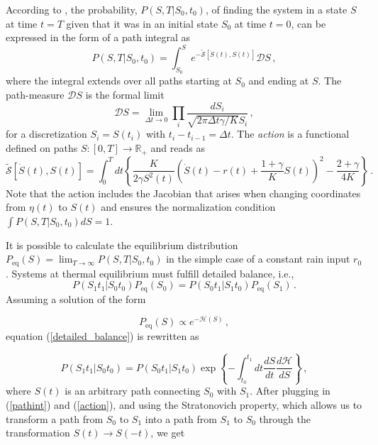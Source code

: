 \documentclass[11pt, a4paper]{article}
\begin{document}
According to \cite{lau_2007_StateDepDiff}, the probability, $P(S,T|S_0,t_0)$, of finding the system in a state $S$ at time $t = T$ given that it was in an initial state $S_0$ at time $t = 0$, can be expressed in the form of a path integral as
\begin{equation}\label{pathint}
P(S,T|S_0,t_0) = \int_{S_0}^{S} e^{-\tilde{\mathcal S}[\dot{S}(t),S(t)]} \mathcal{D}S \,,
\end{equation}
where the integral extends over all paths starting at $S_0$ and ending at $S$.
The path-measure $\mathcal DS$ is the formal limit
\begin{equation}\label{pathmeasure}
{\mathcal D}S
=
\lim_{\Delta t\rightarrow 0}
\prod_{i}
\frac{dS_i}{\sqrt{2\pi \mathit{\Delta t} \gamma/K }S_i}\,,
\end{equation}
for a discretization $S_i = S(t_i)$ with $t_i-t_{i-1}=\Delta t$.
The {\em action} is a functional defined on paths $S:[0,T]\longrightarrow \mathbb R_+$ and reads as
\begin{equation}\label{action}
  \tilde{\mathcal S}[\dot{S}(t),S(t)]
  =
  \int_0^T
  dt
  \left\{
    \frac{K}{2\gamma S^2(t)}
    \left(
        \dot S(t)
        -
        r(t)
        +
        \frac{1+\gamma}{K}S(t)
    \right)^2
    -
    \frac{2+\gamma}{4K}
  \right\}
 \,.
\end{equation}
Note that the action includes the Jacobian that arises when changing coordinates from ${\eta(t)}$ to $S(t)$ and ensures the normalization condition $\int{ P(S,T|S_0,t_0) \mathit{dS}}=1$.

It is possible to calculate the equilibrium distribution $P_{\text{eq}}(S) = \lim_{T\rightarrow\infty} P(S,T|S_0,t_0)$ in the simple case of a constant rain input $r_{0}$. Systems at thermal equilibrium must fulfill detailed balance, i.e.,
\begin{equation}\label{detailed_balance}
P(S_1 t_1 | S_0 t_0 ) P_{\text{eq}}(S_0) = P(S_0 t_1 | S_1 t_0 ) P_{\text{eq}}(S_1) \,.
\end{equation}
Assuming a solution of the form

\begin{equation}\label{Peq}
  P_{\text{eq}}(S)
  \propto
  e^{-\mathcal{H}(S)}\,,
\end{equation}
equation (\ref{detailed_balance}) is rewritten as

\begin{equation}\label{detailed_balance_2}
P(S_1 t_1 | S_0 t_0 ) = P(S_0 t_1 | S_1 t_0 )
\exp\left\{
        -\int_{t_0}^{t_1} dt \frac{dS}{dt}\frac{d\mathcal{H}}{dS}
    \right\}
\,,
\end{equation}
where $S(t)$ is an arbitrary path connecting $S_0$ with $S_1$.
After plugging in (\ref{pathint}) and (\ref{action}), and using the Stratonovich property, which allows us to transform a path from $S_0$ to $S_1$ into a path from $S_1$ to $S_0$ through the transformation $S(t) \rightarrow S(-t)$, we get
\end{document}
